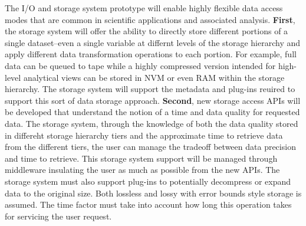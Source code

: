 \documentclass[11pt,letterpaper]{article}
\newcommand{\hasan}[1]{{\it \color{darkgreen} #1 -Hasan }}
\newcommand{\hasan}[1]{}
\begin{document}
The I/O and storage system prototype will enable
highly flexible data access modes that are common in scientific applications
and associated analysis.
%
%
\textbf{First}, the storage system will offer the ability to directly store
different portions of a single dataset--even a single variable at differnt
levels of the storage hierarchy and apply different data transformation
operations to each portion. For example, full data can be queued to tape while
a highly compressed version intended for high-level analytical views can be
stored in NVM or even RAM within the storage hierarchy. The storage system will
support the metadata and plug-ins reuired to support this sort of data storage
approach.
%
\textbf{Second}, new storage access APIs will be developed that understand the
notion of a time and data quality for requested data. The storage system,
through the knowledge of both the data quality stored in differeht storage
hierarchy tiers and the approximate time to retrieve data from the different
tiers, the user can manage the tradeoff between data precision and time to
retrieve. This storage system support will be managed through middleware
insulating the user as much as possible from the new APIs. The storage system
must also support plug-ins to potentially decompress or expand data to the
original size. Both lossless and lossy with error bounds style storage is
assumed. The time factor must take into account how long this operation takes
for servicing the user request.
\end{document}
